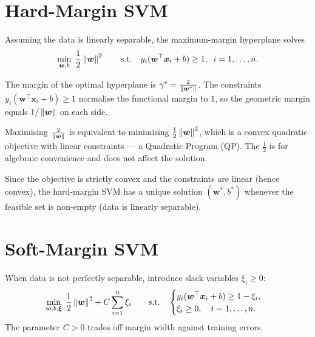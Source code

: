 \section{Hard-Margin SVM}

\begin{definition}
Assuming the data is linearly separable, the maximum-margin hyperplane solves
\[
    \min_{\bm{w}, b}\; \frac{1}{2}\left\| \bm{w} \right\|^2
    \qquad \text{s.t.}\quad y_i(\bm{w}^\top\bm{x}_i + b) \geq 1, \;\; i = 1,\ldots,n.
\]
\end{definition}

\begin{theorem}
The margin of the optimal hyperplane is $\gamma^* = \frac{2}{\left\| \bm{w}^* \right\|}$. The constraints $y_i(\bm{w}^\top\bm{x}_i+b) \geq 1$ normalise the functional margin to $1$, so the geometric margin equals $1/\left\| \bm{w} \right\|$ on each side.
\end{theorem}

\begin{remark}
Maximising $\frac{2}{\left\| \bm{w} \right\|}$ is equivalent to minimising $\frac{1}{2}\left\| \bm{w} \right\|^2$, which is a convex quadratic objective with linear constraints --- a Quadratic Program (QP). The $\frac{1}{2}$ is for algebraic convenience and does not affect the solution.
\end{remark}

\begin{proposition}[Uniqueness]
Since the objective is strictly convex and the constraints are linear (hence convex), the hard-margin SVM has a unique solution $(\bm{w}^*,b^*)$ whenever the feasible set is non-empty (data is linearly separable).
\end{proposition}

\section{Soft-Margin SVM}

\begin{definition}
When data is not perfectly separable, introduce slack variables $\xi_i \geq 0$:
\[
    \min_{\bm{w}, b, \bm{\xi}}\; \frac{1}{2}\left\| \bm{w} \right\|^2 + C\sum_{i=1}^{n}\xi_i
    \qquad \text{s.t.}\quad
    \begin{cases}
        y_i(\bm{w}^\top\bm{x}_i + b) \geq 1 - \xi_i,\\
        \xi_i \geq 0, \quad i = 1,\ldots,n.
    \end{cases}
\]
The parameter $C > 0$ trades off margin width against training errors.
\end{definition}

